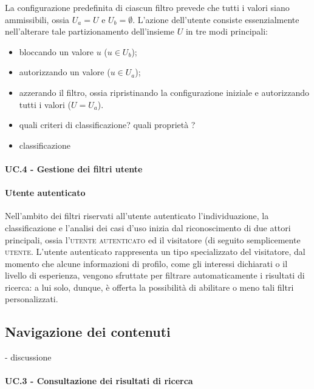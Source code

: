 La configurazione predefinita di ciascun filtro prevede che tutti i valori siano ammissibili, ossia $U_a = U$ e $U_b = \emptyset$. L'azione dell'utente consiste essenzialmente nell'alterare tale partizionamento dell'insieme $U$ in tre modi principali:
\begin{itemize}
	\item bloccando un valore $u$ ($u \in U_b$);
	\item autorizzando un valore ($u \in U_a$);
	\item azzerando il filtro, ossia ripristinando la configurazione iniziale e autorizzando tutti i valori ($U = U_a$).
\end{itemize}

\begin{itemize}
	\item quali criteri di classificazione? quali proprietà ?
	\item classificazione
\end{itemize}

\paragraph{UC.4 - Gestione dei filtri utente}

\paragraph{Utente autenticato}
Nell'ambito dei filtri riservati all'utente autenticato l'individuazione, la classificazione e l'analisi dei casi d'uso inizia dal riconoscimento di due attori principali, ossia l'\textsc{utente autenticato} ed il visitatore (di seguito semplicemente \textsc{utente}. L'utente autenticato rappresenta un tipo specializzato del visitatore, dal momento che alcune informazioni di profilo, come gli interessi dichiarati o il livello di esperienza, vengono sfruttate per filtrare automaticamente i risultati di ricerca: a lui solo, dunque, è offerta la possibilità di abilitare o meno tali filtri personalizzati.

\subsection{Navigazione dei contenuti}
- discussione

\paragraph{UC.3 - Consultazione dei risultati di ricerca}
